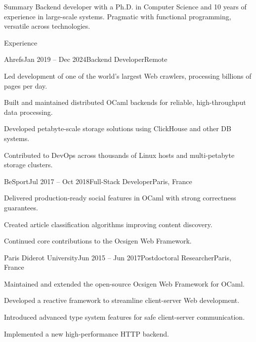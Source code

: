 \documentclass[11pt]{resume}
\begin{document}
\begin{rSection}{Summary}
Backend developer with a Ph.D. in Computer Science and 10 years of
experience in large-scale systems. Pragmatic with functional
programming, versatile across technologies.
\end{rSection}

\begin{rSection}{Experience}

  \begin{rSubsection}{Ahrefs}{Jan 2019 -- Dec 2024}{Backend
      Developer}{Remote}
  \item Led development of one of the world’s largest Web crawlers,
    processing billions of pages per day.
  \item Built and maintained distributed OCaml backends for reliable,
    high-throughput data processing.
  \item Developed petabyte-scale storage solutions using ClickHouse
    and other DB systems.
  \item Contributed to DevOps across thousands of Linux hosts and
    multi-petabyte storage clusters.
  \end{rSubsection}

  \begin{rSubsection}{BeSport}{Jul 2017 -- Oct 2018}{Full-Stack
      Developer}{Paris, France}
  \item Delivered production-ready social features in OCaml with
    strong correctness guarantees.
  \item Created article classification algorithms improving content
    discovery.
  \item Continued core contributions to the Ocsigen Web Framework.
  \end{rSubsection}

  \begin{rSubsection}{Paris Diderot University}{Jun 2015 -- Jun
      2017}{Postdoctoral Researcher}{Paris, France}
  \item Maintained and extended the open-source Ocsigen Web Framework
    for OCaml.
  \item Developed a reactive framework to streamline client-server Web
    development.
  \item Introduced advanced type system features for safe
    client-server communication.
  \item Implemented a new high-performance HTTP backend.
  \end{rSubsection}

\end{rSection}
\end{document}
